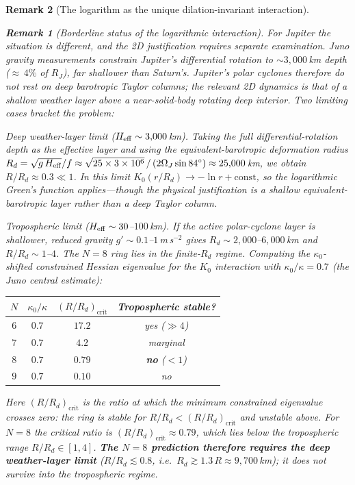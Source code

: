\documentclass[12pt, a4paper]{article}
\newtheorem{remark}{Remark}[section]
\numberwithin{equation}{section}
\begin{document}
\begin{remark}[The logarithm as the unique dilation-invariant interaction]
\begin{remark}[Borderline status of the logarithmic interaction]
For Jupiter the situation is different, and the 2D justification
requires separate examination.  Juno gravity measurements
\citep{Kaspi2018} constrain Jupiter's differential rotation to
$\sim\!3{,}000$\,km depth (${\approx}\,4\%$ of $R_J$), far shallower
than Saturn's.  Jupiter's polar cyclones therefore do \emph{not} rest
on deep barotropic Taylor columns; the relevant 2D dynamics is that of
a shallow weather layer above a near-solid-body rotating deep interior.
Two limiting cases bracket the problem:

\textit{Deep weather-layer limit ($H_{\rm eff} \sim 3{,}000$\,km).}
Taking the full differential-rotation depth as the effective layer
and using the equivalent-barotropic deformation radius
$R_d = \sqrt{g\,H_{\rm eff}}/f \approx \sqrt{25 \times 3\times10^6}\,/\,
(2\Omega_J\sin 84^\circ) \approx 25{,}000$\,km, we obtain
$R/R_d \approx 0.3 \ll 1$.  In this limit
$K_0(r/R_d) \to -\ln r + \mathrm{const}$, so the logarithmic
Green's function applies---though the physical justification is
a shallow equivalent-barotropic layer rather than a deep Taylor column.

\textit{Tropospheric limit ($H_{\rm eff} \sim 30$--$100$\,km).}
If the active polar-cyclone layer is shallower, reduced gravity
$g' \sim 0.1$--$1$\,m\,s$^{-2}$ gives
$R_d \sim 2{,}000$--$6{,}000$\,km and $R/R_d \sim 1$--$4$.
The $N = 8$ ring lies in the finite-$R_d$ regime.  Computing the
$\kappa_0$-shifted constrained Hessian eigenvalue for the $K_0$
interaction with $\kappa_0/\kappa = 0.7$ (the Juno central estimate):
\begin{center}
\begin{tabular}{cccc}
\toprule
$N$ & $\kappa_0/\kappa$ & $(R/R_d)_{\mathrm{crit}}$ & Tropospheric stable? \\
\midrule
$6$ & $0.7$ & $17.2$ & yes ($\gg 4$) \\
$7$ & $0.7$ & $4.2$  & marginal \\
$8$ & $0.7$ & $\mathbf{0.79}$ & \textbf{no} ($< 1$) \\
$9$ & $0.7$ & $0.10$ & no \\
\bottomrule
\end{tabular}
\end{center}
Here $(R/R_d)_{\mathrm{crit}}$ is the ratio at which the minimum
constrained eigenvalue crosses zero: the ring is stable for
$R/R_d < (R/R_d)_{\mathrm{crit}}$ and unstable above.  For $N = 8$
the critical ratio is $(R/R_d)_{\mathrm{crit}} \approx 0.79$, which
lies \emph{below} the tropospheric range $R/R_d \in [1, 4]$.
\textbf{The $N = 8$ prediction therefore requires the deep
weather-layer limit} ($R/R_d \lesssim 0.8$, i.e.\
$R_d \gtrsim 1.3\,R \approx 9{,}700$\,km); it does not survive
into the tropospheric regime.


\end{remark}
\end{remark}
\end{document}
